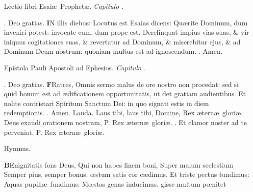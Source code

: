 \documentclass[letter,11pt]{book}
\makeatletter
\DeclareRobustCommand{\Vbar}{\vers@resp{-0.1em}{V}}
\DeclareRobustCommand{\Rbar}{\vers@resp{0pt}{R}}
\newcommand{\vers@resp@sym}{\raisebox{0.2ex}{\rotatebox[origin=c]{-20}{$\m@th\rceil$}}}
\newcommand{\vers@resp}[2]{%
  {\ooalign{\hidewidth\kern#1\vers@resp@sym\hidewidth\cr#2\cr}}%
}%
\def\P{\color{Red} P. \color{black}}
\def\V{\color{Red} \Vbar . \color{black}}
\def\R{\color{Red} \Rbar . \color{black}}
\makeatother
\begin{document}
\begin{multicols*}{2}
\vspace{-.5em} \begin{center} {\color{Red} L}ectio libri Esai\ae \ Prophet\ae . \itshape Capitulo . \end{center} \vspace{-.5em}
\par \noindent \R Deo gratias.
\lettrine[lines=2]{\bfseries \color{Red} I}{}N illis diebus: Locutus est Esaias dicens: Qu\ae rite Dominum, dum inveniri potest: invocate eum, dum prope est. Derelinquat impius vias suas, \& vir iniquus cogitationes suas, \& revertatur ad Dominum, \& miserebitur ejus, \& ad Dominum Deum nostrum: quoniam multus est ad ignoscendum. \R Amen.
\vspace{-.5em} \begin{center} {\color{Red} E}pistola Pauli Apostoli ad Ephesios. \itshape Capitulo . \end{center} \vspace{-.5em}
\par \noindent \R Deo gratias.
\lettrine[lines=2]{\bfseries \color{Red} F}{}Ratres, Omnis sermo malus de ore nostro non procedat: sed si quid bonum est ad \ae dificationem opportunitatis, ut det gratiam audientibus. Et nolite contristari Spiritum Sanctum Dei: in quo signati estis in diem redemptionis. \R Amen.
\newline \color{Red} Lauda. \color{black} Laus tibi, laus tibi, Domine, Rex \ae tern\ae \ glori\ae . Deus exaudi orationem nostram, \P Rex \ae tern\ae \ glori\ae . \V Et clamor noster ad te perveniat, \P Rex \ae tern\ae \ glori\ae .
\vspace{-.5em} \begin{center} \color{Red} Hymnus. \end{center} \vspace{-.5em}
\lettrine[lines=2]{\bfseries \color{Red} B}{}Enignitatis fons Deus,
\newline Qui non habes finem boni,
\newline \indent Super malum scelestium
\newline \indent Semper pius, semper bonus.
\oe stum satis cor c\ae dimus,
\newline \indent Et triste pectus tundimus:
\newline \indent Aquas pupill\ae \ fundimus:
\newline \indent M\oe stas genas inducimus.
gisse multum p\oe nitet

\end{multicols*}
\end{document}
